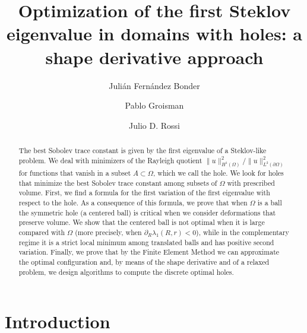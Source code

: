 \documentclass[11pt]{amsart}
\title[Steklov eigenvalue problem]{Optimization of the first Steklov eigenvalue in domains with holes: a shape derivative approach}
\author[J. Fernández Bonder]{Julián Fernández Bonder}
\author[P. Groisman]{Pablo Groisman}
\author[J. D. Rossi]{Julio D. Rossi}
\theoremstyle{remark}
\numberwithin{equation}{section}
\begin{document}
\begin{abstract}
The best Sobolev trace constant is given by the first eigenvalue of a Steklov-like problem. We deal with minimizers of the Rayleigh quotient $\|u\|^2_{H^1(\Omega)}/\|u\|^2_{L^2(\partial\Omega)}$ for functions that vanish in a subset $A\subset\Omega$, which we call the hole. We look for holes that minimize the best Sobolev trace constant among subsets of $\Omega$ with prescribed volume. First, we find a formula for the first variation of the first eigenvalue with respect to the hole. As a consequence of this formula, we prove that when $\Omega$ is a ball the symmetric hole (a centered ball) is critical when we consider deformations that preserve volume. We show that the centered ball is not optimal when it is large compared with $\Omega$ (more precisely, when $\partial_R\lambda_1(R,r)<0$), while in the complementary regime it is a strict local minimum among translated balls and has positive second variation. Finally, we prove that by the Finite Element Method we can approximate the optimal configuration and, by means of the shape derivative and of a relaxed problem, we design algorithms to compute the discrete optimal holes.
\end{abstract}

\maketitle

\section{Introduction}
\end{document}
